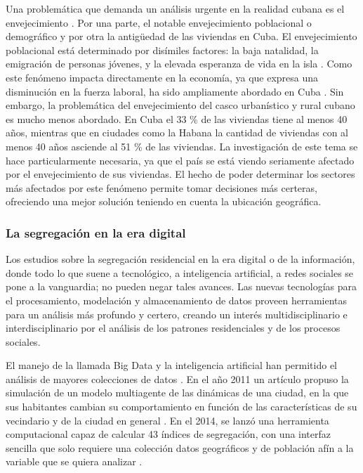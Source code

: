 Una problemática que demanda un análisis urgente en la realidad cubana es el envejecimiento \cite{CONEI2012}. Por una parte, el notable envejecimiento poblacional o demográfico y por otra la antigüedad de las viviendas en Cuba. El envejecimiento poblacional está determinado por disímiles factores: la baja natalidad, la emigración de personas jóvenes, y la elevada esperanza de vida en la isla \cite{Hernndez2015EnvejecimientoPE}. Como este fenómeno impacta directamente en la economía, ya que expresa una disminución en la fuerza laboral, ha sido ampliamente abordado en Cuba \cite{Prez2017ElED} \cite{R2020}. Sin embargo, la problemática del envejecimiento del casco urbanístico y rural cubano es mucho menos abordado. En Cuba el 33 \% de las viviendas tiene al menos 40 años, mientras que en ciudades como la Habana la cantidad de viviendas con al menos 40 años asciende al 51 \% de las viviendas. La investigación de este tema se hace particularmente necesaria, ya que el país se está viendo seriamente afectado por el envejecimiento de sus viviendas. El hecho de poder determinar los sectores más afectados por este fenómeno permite tomar decisiones más certeras, ofreciendo una mejor solución teniendo en cuenta la ubicación geográfica.



\subsubsection{La segregación en la era digital}

Los estudios sobre la segregación residencial en la era digital o de la información, donde todo lo que suene a tecnológico, a inteligencia artificial, a redes sociales se pone a la vanguardia; no pueden negar tales avances. Las nuevas tecnologías para el procesamiento, modelación y almacenamiento de datos proveen herramientas para un análisis más profundo y certero, creando un interés multidisciplinario e interdisciplinario por el análisis de los patrones residenciales y de los procesos sociales. 

El manejo de la llamada Big Data y la inteligencia artificial han permitido el análisis de mayores colecciones de datos \cite{man2018can}. En el año 2011 un artículo propuso la simulación de un modelo multiagente de las dinámicas de una ciudad, en la que sus habitantes cambian su comportamiento en función de las características de su vecindario y de la ciudad en general \cite{Feitosa2011MultiagentSF}. En el 2014, se lanzó una herramienta computacional capaz de 
calcular 43 índices de segregación, con una interfaz sencilla que solo requiere una colección datos geográficos y de población afín a la variable que se quiera analizar \cite{apparicio2014open}. 

